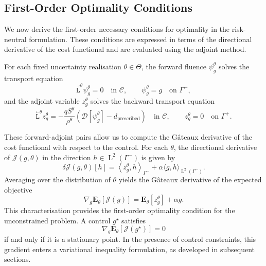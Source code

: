 \documentclass{amsart}
\newcommand{\fL}{\stackrel{_\rightarrow}{\mathtt L}}
\newcommand{\bL}{\stackrel{_\leftarrow}{\mathtt L}}
\theoremstyle{plain}
\newcommand{\leb}{\text{Leb}}
\newcommand{\LL}{\ensuremath{\operatorname L}\xspace}
\renewcommand{\leb}[1]{\ensuremath{\LL^{#1}}}
\newcommand{\ltwop}[2]{\ensuremath{\!\left\langle{#1,#2}\right\rangle}}
\begin{document}
\subsection{First-Order Optimality Conditions}
\label{subsec:optimality-conditions}

We now derive the first-order necessary conditions for optimality in
the risk-neutral formulation. These conditions are expressed in terms
of the directional derivative of the cost functional and are evaluated
using the adjoint method.

For each fixed uncertainty realisation $\theta \in \Theta$, the
forward fluence $\psi_g^\theta$ solves the transport equation
\begin{equation}
  \fL^\theta \psi_g^\theta = 0 \quad \text{in } \mathcal{C}, \qquad \psi_g^\theta = g \quad \text{on } \Gamma^-,
\end{equation}
and the adjoint variable $z_g^\theta$ solves the backward transport
equation
\begin{equation}
  \bL^\theta z_g^\theta = -\frac{q S^\theta}{\rho^\theta} \left( \mathcal{D}[\psi_g^\theta] - d_{\mathrm{prescribed}} \right) \quad \text{in } \mathcal{C}, \qquad z_g^\theta = 0 \quad \text{on } \Gamma^+.
\end{equation}

These forward-adjoint pairs allow us to compute the G\^ateaux
derivative of the cost functional with respect to the control. For
each $\theta$, the directional derivative of $\mathcal{J}(g, \theta)$
in the direction $h \in \leb2(\Gamma^-)$ is given by
\begin{equation}
  \delta \mathcal{J}(g,\theta)[h] = \ltwop{z_g^\theta}{h}_{\Gamma^-} + \alpha \langle g, h \rangle_{\leb2(\Gamma^-)}.
\end{equation}
Averaging over the distribution of $\theta$ yields the G\^ateaux
derivative of the expected objective
\begin{equation}
  \nabla_g \mathbf{E}_\theta[\mathcal{J}(g)] = \mathbf{E}_\theta[z_g^\theta] + \alpha g.
\end{equation}
This characterisation provides the first-order optimality condition
for the unconstrained problem. A control $g^\star$ satisfies
\begin{equation}
  \nabla_g \mathbf{E}_\theta[\mathcal{J}(g^\star)] = 0
\end{equation}
if and only if it is a stationary point. In the presence of control
constraints, this gradient enters a variational inequality
formulation, as developed in subsequent sections.
\end{document}
